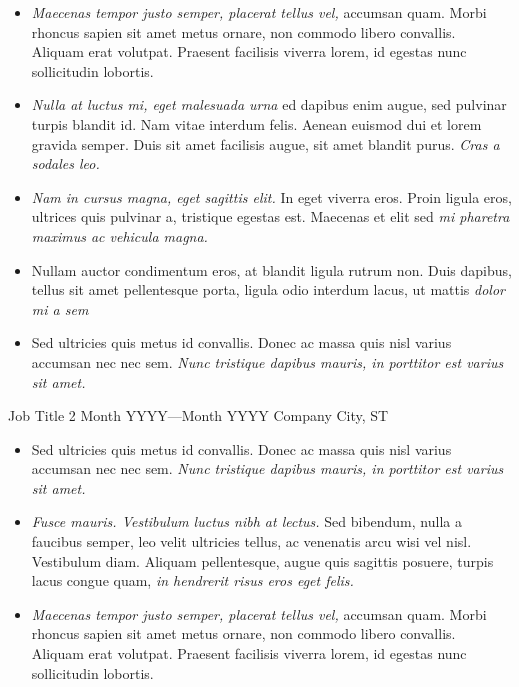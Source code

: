 \documentclass{james-cv}
\begin{document}
\lipsum[1]

\begin{itemize}
\item{
  \emph{Maecenas tempor justo semper, placerat tellus vel,} accumsan quam. Morbi
  rhoncus sapien sit amet metus ornare, non commodo libero convallis. Aliquam
  erat volutpat. Praesent facilisis viverra lorem, id egestas nunc sollicitudin
  lobortis. 
}
\item{
  \emph{Nulla at luctus mi, eget malesuada urna} ed dapibus enim augue, sed 
  pulvinar turpis blandit id. Nam vitae interdum felis. Aenean euismod dui et 
  lorem gravida semper. Duis sit amet facilisis augue, sit amet blandit purus. 
  \emph{Cras a sodales leo.}
}
\item{
  \emph{Nam in cursus magna, eget sagittis elit.} In eget viverra eros. Proin 
  ligula eros, ultrices quis pulvinar a, tristique egestas est. Maecenas et elit
  sed \emph{mi pharetra maximus ac vehicula magna.}
}
\item{
  Nullam auctor condimentum eros, at blandit ligula rutrum non. Duis dapibus, 
  tellus sit amet pellentesque porta, ligula odio interdum lacus, ut mattis
  \emph{dolor mi a sem}
}
\item{
  Sed ultricies quis metus id convallis. Donec ac massa quis nisl varius accumsan
  nec nec sem. \emph{Nunc tristique dapibus mauris, in porttitor est varius sit
  amet.}
}
\end{itemize}

\makesecondpage{}

\employment
  {Job Title 2}
  {Month YYYY---Month YYYY}
  {Company}
  {City, ST}

\lipsum[2]

\begin{itemize}
\item{
  Sed ultricies quis metus id convallis. Donec ac massa quis nisl varius accumsan
  nec nec sem. \emph{Nunc tristique dapibus mauris, in porttitor est varius sit
  amet.}
}
\item{
  \emph{Fusce mauris. Vestibulum luctus nibh at lectus.} Sed bibendum, nulla a
  faucibus semper, leo velit ultricies tellus, ac venenatis
  arcu wisi vel nisl. Vestibulum diam. Aliquam pellentesque, augue quis sagittis
  posuere, turpis lacus congue quam, \emph{in hendrerit risus eros eget felis.}
}
\item{
  \emph{Maecenas tempor justo semper, placerat tellus vel,} accumsan quam. Morbi
  rhoncus sapien sit amet metus ornare, non commodo libero convallis. Aliquam
  erat volutpat. Praesent facilisis viverra lorem, id egestas nunc sollicitudin
  lobortis. 
}
\end{itemize}
\end{document}
